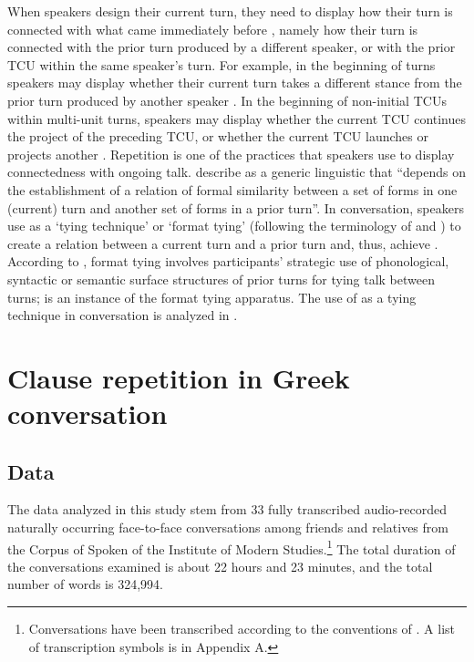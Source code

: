 \documentclass[output=paper]{LSP/langsci}
\begin{document}
When speakers design their current turn, they need to display how their turn is connected with what came immediately before \citep[][134]{drew12}, namely how their turn is connected with the prior turn produced by a different speaker, or with the prior TCU within the same speaker’s turn. For example, in the beginning of turns speakers may display whether their current turn takes a different stance from the prior turn produced by another speaker \citep{schegloff96b}. In the beginning of non-initial TCUs within multi-unit turns, speakers may display whether the current TCU continues the project of the preceding TCU, or whether the current TCU launches or projects another  \citep[][481]{maze12}. Repetition is one of the practices that speakers use to display connectedness with ongoing talk. \citet{couper17} describe  as a generic linguistic  that ``depends on the establishment of a relation of formal similarity between a set of forms in one (current) turn and another set of forms in a prior turn''. In conversation, speakers use  as a `tying technique' \citep{sacks95} or `format tying' (following the terminology of \citealt{goodwin87} and \citealt{goodwin90}) to create a relation between a current turn and a prior turn and, thus, achieve . According to \citet[][177]{goodwin90}, format tying involves participants’ strategic use of phonological, syntactic or semantic surface structures of prior turns for tying talk between turns;  is an instance of the format tying apparatus. The use of  as a tying technique in  conversation is analyzed in .  

\section{Clause repetition in Greek conversation}
\label{Alclause.repetition}

\subsection{Data}
\label{Alclause.repetition.data}
The data analyzed in this study stem from 33 fully transcribed audio-recorded naturally occurring face-to-face conversations among friends and relatives from the Corpus of Spoken  of the Institute of Modern  Studies.\footnote{Conversations have been transcribed according to the conventions of . A list of transcription symbols is in Appendix A.} The total duration of the conversations examined is about 22 hours and 23 minutes, and the total number of words is 324,994.
\end{document}
